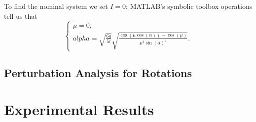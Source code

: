 To find the nominal system we set \(I = 0\); 
MATLAB's symbolic toolbox operations tell us that
\begin{equation}\label{eqn:acrobot-nominal-ma-dynamics}
    \begin{cases}
        \dot{\mu} = 0
        , \\
        \dot{alpha} = \sqrt{\frac{6g}{5l}} 
        \sqrt{\frac{\cos(\mu\cos(\alpha)) - \cos(\mu)}{\mu^2 \sin(\alpha)^2}}
        .
    \end{cases}
\end{equation}

\subsection*{Perturbation Analysis for Rotations}

\section{Experimental Results}

